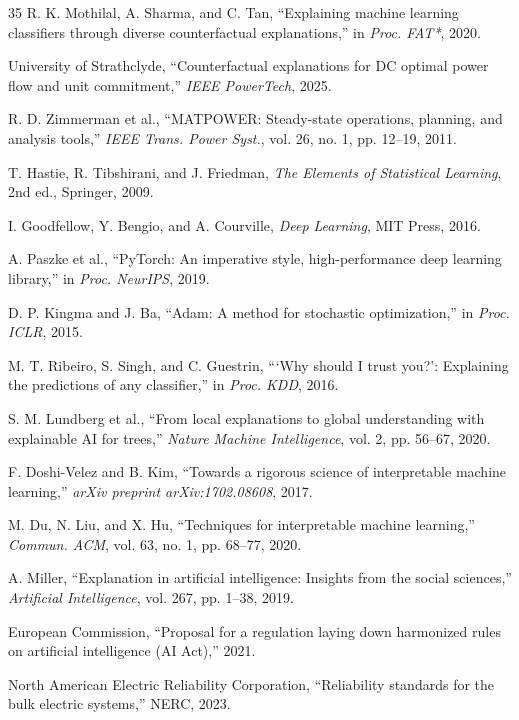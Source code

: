 \documentclass[journal,12pt,onecolumn]{IEEEtran}
\begin{document}
\begin{thebibliography}{35}
R. K. Mothilal, A. Sharma, and C. Tan, ``Explaining machine learning classifiers through diverse counterfactual explanations,'' in \emph{Proc. FAT*}, 2020.

University of Strathclyde, ``Counterfactual explanations for DC optimal power flow and unit commitment,'' \emph{IEEE PowerTech}, 2025.

R. D. Zimmerman et al., ``MATPOWER: Steady-state operations, planning, and analysis tools,'' \emph{IEEE Trans. Power Syst.}, vol. 26, no. 1, pp. 12--19, 2011.

T. Hastie, R. Tibshirani, and J. Friedman, \emph{The Elements of Statistical Learning}, 2nd ed., Springer, 2009.

I. Goodfellow, Y. Bengio, and A. Courville, \emph{Deep Learning}, MIT Press, 2016.

A. Paszke et al., ``PyTorch: An imperative style, high-performance deep learning library,'' in \emph{Proc. NeurIPS}, 2019.

D. P. Kingma and J. Ba, ``Adam: A method for stochastic optimization,'' in \emph{Proc. ICLR}, 2015.

M. T. Ribeiro, S. Singh, and C. Guestrin, ```Why should I trust you?': Explaining the predictions of any classifier,'' in \emph{Proc. KDD}, 2016.

S. M. Lundberg et al., ``From local explanations to global understanding with explainable AI for trees,'' \emph{Nature Machine Intelligence}, vol. 2, pp. 56--67, 2020.

F. Doshi-Velez and B. Kim, ``Towards a rigorous science of interpretable machine learning,'' \emph{arXiv preprint arXiv:1702.08608}, 2017.

M. Du, N. Liu, and X. Hu, ``Techniques for interpretable machine learning,'' \emph{Commun. ACM}, vol. 63, no. 1, pp. 68--77, 2020.

A. Miller, ``Explanation in artificial intelligence: Insights from the social sciences,'' \emph{Artificial Intelligence}, vol. 267, pp. 1--38, 2019.

European Commission, ``Proposal for a regulation laying down harmonized rules on artificial intelligence (AI Act),'' 2021.

North American Electric Reliability Corporation, ``Reliability standards for the bulk electric systems,'' NERC, 2023.


\end{thebibliography}
\end{document}
